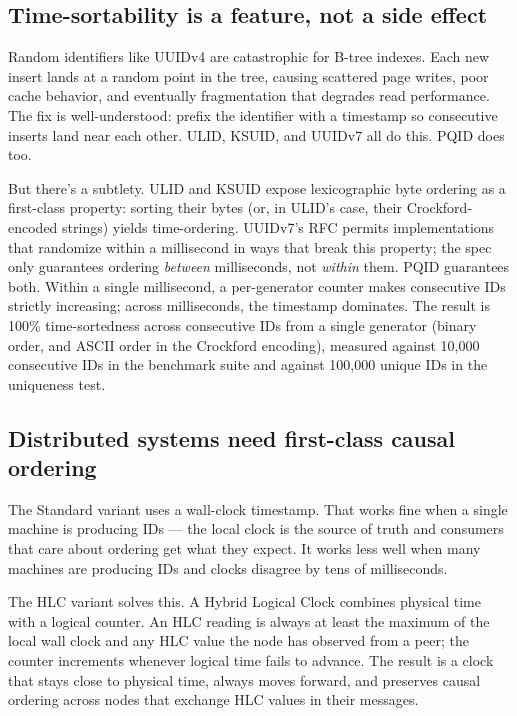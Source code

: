 \subsection{Time-sortability is a feature, not a side effect}

Random identifiers like UUIDv4 are catastrophic for B-tree indexes. Each new insert lands at a random point in the tree, causing scattered page writes, poor cache behavior, and eventually fragmentation that degrades read performance. The fix is well-understood: prefix the identifier with a timestamp so consecutive inserts land near each other. ULID, KSUID, and UUIDv7 all do this. PQID does too.

But there's a subtlety. ULID and KSUID expose lexicographic byte ordering as a first-class property: sorting their bytes (or, in ULID's case, their Crockford-encoded strings) yields time-ordering. UUIDv7's RFC permits implementations that randomize within a millisecond in ways that break this property; the spec only guarantees ordering \emph{between} milliseconds, not \emph{within} them. PQID guarantees both. Within a single millisecond, a per-generator counter makes consecutive IDs strictly increasing; across milliseconds, the timestamp dominates. The result is 100\% time-sortedness across consecutive IDs from a single generator (binary order, and ASCII order in the Crockford encoding), measured against 10{,}000 consecutive IDs in the benchmark suite and against 100{,}000 unique IDs in the uniqueness test.

\subsection{Distributed systems need first-class causal ordering}

The Standard variant uses a wall-clock timestamp. That works fine when a single machine is producing IDs --- the local clock is the source of truth and consumers that care about ordering get what they expect. It works less well when many machines are producing IDs and clocks disagree by tens of milliseconds.

The HLC variant solves this. A Hybrid Logical Clock \citep{kulkarni2014hlc} combines physical time with a logical counter. An HLC reading is always at least the maximum of the local wall clock and any HLC value the node has observed from a peer; the counter increments whenever logical time fails to advance. The result is a clock that stays close to physical time, always moves forward, and preserves causal ordering across nodes that exchange HLC values in their messages.

